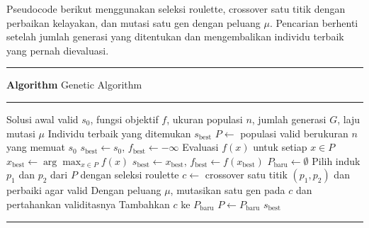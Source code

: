 Pseudocode berikut menggunakan seleksi roulette, crossover satu titik dengan perbaikan kelayakan, dan mutasi satu gen dengan peluang $\mu$. Pencarian berhenti setelah jumlah generasi yang ditentukan dan mengembalikan individu terbaik yang pernah dievaluasi.

\begingroup
\setlength{\parskip}{0pt}
\begin{list}{}{\setlength{\leftmargin}{0.05\linewidth}\setlength{\rightmargin}{0.05\linewidth}\setlength{\labelsep}{0pt}\setlength{\topsep}{0pt}\setlength{\partopsep}{0pt}\setlength{\parsep}{0pt}\setlength{\itemsep}{0pt}}\item[]
\noindent\rule{\linewidth}{0.8pt}\par\vspace{1pt}
\noindent{}\textbf{Algorithm \thealgorithm} Genetic Algorithm\label{alg:genetic-algorithm}\par
\vspace{1pt}\noindent\rule{\linewidth}{0.4pt}\par\vspace{1pt}
\begin{algorithmic}
    \REQUIRE Solusi awal valid $s_0$, fungsi objektif $f$, ukuran populasi $n$, jumlah generasi $G$, laju mutasi $\mu$
    \ENSURE Individu terbaik yang ditemukan $s_{\text{best}}$
    \STATE $P \gets$ populasi valid berukuran $n$ yang memuat $s_0$
    \STATE $s_{\text{best}} \gets s_0$, $f_{\text{best}} \gets -\infty$
    \STATE Evaluasi $f(x)$ untuk setiap $x \in P$
    \STATE $x_{\text{best}} \gets \arg\max_{x \in P} f(x)$
    \STATE $s_{\text{best}} \gets x_{\text{best}}$, $f_{\text{best}} \gets f(x_{\text{best}})$
    \ENDIF
    \STATE $P_{\text{baru}} \gets \emptyset$
    \STATE Pilih induk $p_1$ dan $p_2$ dari $P$ dengan seleksi roulette
    \STATE $c \gets$ crossover satu titik $(p_1,p_2)$ dan perbaiki agar valid
    \STATE Dengan peluang $\mu$, mutasikan satu gen pada $c$ dan pertahankan validitasnya
    \STATE Tambahkan $c$ ke $P_{\text{baru}}$
    \ENDWHILE
    \STATE $P \gets P_{\text{baru}}$
    \ENDIF
    \ENDFOR
    \RETURN $s_{\text{best}}$
\end{algorithmic}
\par\vspace{1pt}\noindent\rule{\linewidth}{0.8pt}

\end{list}
\endgroup
